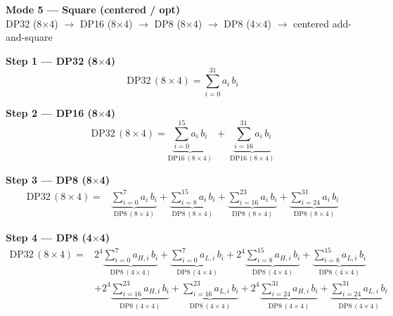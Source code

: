 \documentclass[fleqn]{article}
\newcommand{\DPop}[3]{\mathrm{DP#1}\,(#2\!\times\!#3)}
\begin{document}
\begin{center}
{\LARGE \textbf{Mode 5 --- Square (centered / opt)}}\\[4pt]
{\large DP32 (8$\times$4) $\rightarrow$ DP16 (8$\times$4) $\rightarrow$ DP8 (8$\times$4) $\rightarrow$ DP8 (4$\times$4) $\rightarrow$ centered add-and-square}
\end{center}

\vspace{0.1em}

\textbf{Step 1 --- DP32 (8$\times$4)}
\[
\DPop{32}{8}{4} = \sum_{i=0}^{31} a_i \, b_i
\]

\textbf{Step 2 --- DP16 (8$\times$4)}
\[
\DPop{32}{8}{4}
  = \underbrace{\sum_{i=0}^{15} a_i \, b_i}_{\DPop{16}{8}{4}}
  \; + \; \underbrace{\sum_{i=16}^{31} a_i \, b_i}_{\DPop{16}{8}{4}}
\]

\textbf{Step 3 --- DP8 (8$\times$4)}
\begin{align*}
\DPop{32}{8}{4} = {}
  & \underbrace{\sum_{i=0}^{7} a_i \, b_i}_{\DPop{8}{8}{4}}
  + \underbrace{\sum_{i=8}^{15} a_i \, b_i}_{\DPop{8}{8}{4}}
  + \underbrace{\sum_{i=16}^{23} a_i \, b_i}_{\DPop{8}{8}{4}}
  + \underbrace{\sum_{i=24}^{31} a_i \, b_i}_{\DPop{8}{8}{4}}
\end{align*}

\textbf{Step 4 --- DP8 (4$\times$4)}
\begin{align*}
\DPop{32}{8}{4} = {}
  & 2^{4}\underbrace{\sum_{i=0}^{7} a_{H,i}\, b_i}_{\DPop{8}{4}{4}}
  + \underbrace{\sum_{i=0}^{7} a_{L,i}\, b_i}_{\DPop{8}{4}{4}}
  + 2^{4}\underbrace{\sum_{i=8}^{15} a_{H,i}\, b_i}_{\DPop{8}{4}{4}}
  + \underbrace{\sum_{i=8}^{15} a_{L,i}\, b_i}_{\DPop{8}{4}{4}} \\[0.6em]
  & + 2^{4}\underbrace{\sum_{i=16}^{23} a_{H,i}\, b_i}_{\DPop{8}{4}{4}}
  + \underbrace{\sum_{i=16}^{23} a_{L,i}\, b_i}_{\DPop{8}{4}{4}}
  + 2^{4}\underbrace{\sum_{i=24}^{31} a_{H,i}\, b_i}_{\DPop{8}{4}{4}}
  + \underbrace{\sum_{i=24}^{31} a_{L,i}\, b_i}_{\DPop{8}{4}{4}}
\end{align*}
\end{document}
